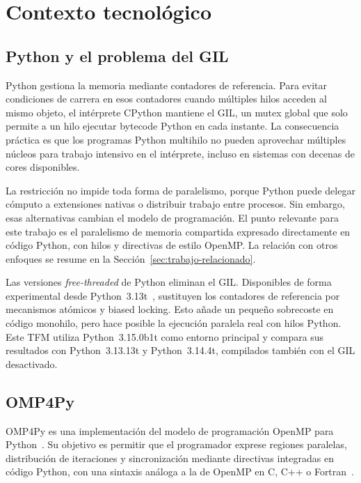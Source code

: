 \chapter{Contexto tecnológico}
\label{chap:contexto}

\section{Python y el problema del GIL}
\label{sec:python-paralelo}

Python gestiona la memoria mediante contadores de referencia. Para evitar
condiciones de carrera en esos contadores cuando múltiples hilos acceden al
mismo objeto, el intérprete CPython mantiene el GIL, un mutex global que solo
permite a un hilo ejecutar bytecode Python en cada instante. La consecuencia
práctica es que los programas Python multihilo no pueden aprovechar múltiples
núcleos para trabajo intensivo en el intérprete, incluso en sistemas con
decenas de cores disponibles.

La restricción no impide toda forma de paralelismo, porque Python puede delegar
cómputo a extensiones nativas o distribuir trabajo entre procesos. Sin embargo,
esas alternativas cambian el modelo de programación. El punto relevante para
este trabajo es el paralelismo de memoria compartida expresado directamente en
código Python, con hilos y directivas de estilo OpenMP. La relación con otros
enfoques se resume en la Sección~\ref{sec:trabajo-relacionado}.

Las versiones \emph{free-threaded} de Python eliminan el GIL. Disponibles de
forma experimental desde Python~3.13t~\cite{PEP703}, sustituyen los contadores
de referencia por mecanismos atómicos y biased locking. Esto añade un pequeño
sobrecoste en código monohilo, pero hace posible la ejecución paralela real con
hilos Python. Este TFM utiliza Python~3.15.0b1t como entorno principal y compara
sus resultados con Python~3.13.13t y Python~3.14.4t, compilados también con el
GIL desactivado.


\section{OMP4Py}
\label{sec:omp4py}

OMP4Py es una implementación del modelo de programación OpenMP para
Python~\cite{PineiroOMP4PyFGCS2026,PineiroOMP4PyCGO2026}. Su objetivo es
permitir que el programador exprese regiones paralelas, distribución de
iteraciones y sincronización mediante directivas integradas en código Python,
con una sintaxis análoga a la de OpenMP en C, C++ o
Fortran~\cite{OpenMPSpec,DagumMenon1998}.

